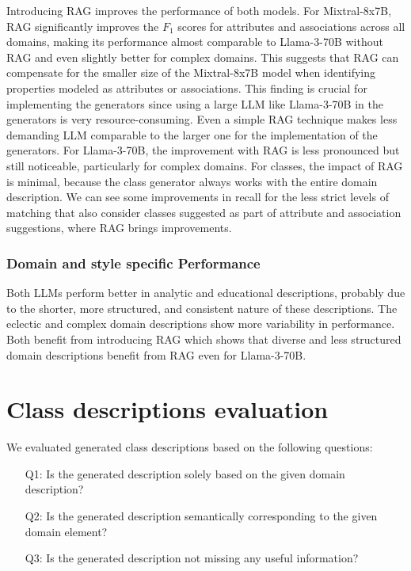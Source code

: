 Introducing RAG improves the performance of both models.
For Mixtral-8x7B, RAG significantly improves the $F_1$ scores for attributes and associations across all domains, making its performance almost comparable to Llama-3-70B without RAG and even slightly better for complex domains.
This suggests that RAG can compensate for the smaller size of the Mixtral-8x7B model when identifying properties modeled as attributes or associations.
This finding is crucial for implementing the generators since using a large LLM like Llama-3-70B in the generators is very resource-consuming.
Even a simple RAG technique makes less demanding LLM comparable to the larger one for the implementation of the generators.
For Llama-3-70B, the improvement with RAG is less pronounced but still noticeable, particularly for complex domains.
For classes, the impact of RAG is minimal, because the class generator always works with the entire domain description.
We can see some improvements in recall for the less strict levels of matching that also consider classes suggested as part of attribute and association suggestions, where RAG brings improvements.


\subsubsection{Domain and style specific Performance}

Both LLMs perform better in analytic and educational descriptions, probably due to the shorter, more structured, and consistent nature of these descriptions.
The eclectic and complex domain descriptions show more variability in performance.
Both benefit from introducing RAG which shows that diverse and less structured domain descriptions benefit from RAG even for Llama-3-70B.


\section{Class descriptions evaluation}

We evaluated generated class descriptions based on the following questions:

\begin{enumerate}
\item [Q1:] Is the generated description solely based on the given domain description?
\item [Q2:] Is the generated description semantically corresponding to the given domain element?
\item [Q3:] Is the generated description not missing any useful information?
\end{enumerate}

